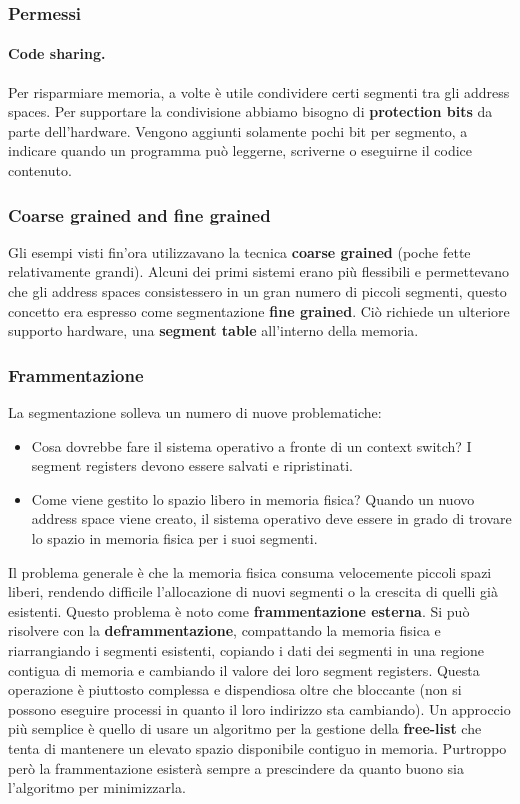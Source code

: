 \documentclass[12pt, twoside, letterpaper]{article}
\begin{document}
			\subsubsection{Permessi}
				\paragraph{Code sharing. }Per risparmiare memoria, a volte è  utile condividere certi segmenti tra gli address spaces. Per supportare la condivisione abbiamo bisogno di \textbf{protection bits} da parte dell'hardware. Vengono aggiunti solamente pochi bit per segmento, a indicare quando un programma può leggerne, scriverne o eseguirne il codice contenuto. 
				
			\subsubsection{Coarse grained and fine grained}
				Gli esempi visti fin'ora utilizzavano la tecnica \textbf{coarse grained} (poche fette relativamente grandi). Alcuni dei primi sistemi erano più flessibili e permettevano che gli address spaces consistessero in un gran numero di piccoli segmenti, questo concetto era espresso come segmentazione \textbf{fine grained}. Ciò richiede un ulteriore supporto hardware, una \textbf{segment table} all'interno della memoria.
				
			\subsubsection{Frammentazione} 
				La segmentazione solleva un numero di nuove problematiche:
				\begin{itemize}
					\item Cosa dovrebbe fare il sistema operativo a fronte di un context switch? I segment registers devono essere salvati e ripristinati. 
					\item Come viene gestito lo spazio libero in memoria fisica? Quando un nuovo address space viene creato, il sistema operativo deve essere in grado di trovare lo spazio in memoria fisica per i suoi segmenti. 	
				\end{itemize}				 
				Il problema generale è che la memoria fisica consuma velocemente piccoli spazi liberi, rendendo difficile l'allocazione di nuovi segmenti o la crescita di quelli già esistenti. Questo problema è noto come \textbf{frammentazione esterna}. Si può risolvere con la \textbf{deframmentazione}, compattando la memoria fisica e riarrangiando i segmenti esistenti, copiando i dati dei segmenti in una regione contigua di memoria e cambiando il valore dei loro segment registers. Questa operazione è piuttosto complessa e dispendiosa oltre che bloccante (non si possono eseguire processi in quanto il loro indirizzo sta cambiando). Un approccio più semplice è quello di usare un algoritmo per la gestione della \textbf{free-list} che tenta di mantenere un elevato spazio disponibile contiguo in memoria. Purtroppo però la frammentazione esisterà sempre a prescindere da quanto buono sia l'algoritmo per minimizzarla.
				
\end{document}
